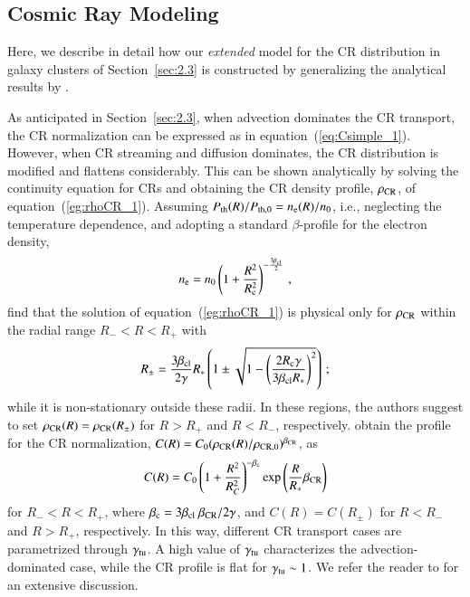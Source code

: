 \documentclass[useAMS,usenatbib]{mn2e}
\begin{document}




\begin{appendix}

\section{Cosmic Ray Modeling}
\label{app:B}

Here, we describe in detail how our \emph{extended} model for the CR distribution
in galaxy clusters of Section~\ref{sec:2.3} is constructed by generalizing the
analytical results by \cite{2011A&A...527A..99E}.

As anticipated in Section~\ref{sec:2.3}, when advection dominates the CR
transport, the CR normalization can be expressed as in
equation~(\ref{eq:Csimple_1}). However, when CR streaming and diffusion
dominates, the CR distribution is modified and flattens considerably. This can
be shown analytically by solving the continuity equation for CRs and obtaining
the CR density profile, $\rho_{{\mathrm{CR}}}$, of
equation~(\ref{eg:rhoCR_1}). Assuming $P_{{\mathrm{th}}}(R)/P_{{\mathrm{th}},0}=n_{{\mathrm{e}}}(R)/n_{0}$, i.e.,
neglecting the temperature dependence, and adopting a standard $\beta$-profile
for the electron density,
%
\begin{equation}
n_{{\mathrm{e}}} = n_{0} \left( 1+\frac{R^{2}}{R_{{\mathrm{c}}}^{2}} \right)^{-\frac{3\beta_{{\mathrm{cl}}}}{2}} \, ,
\label{eq:beta_profile}
\end{equation}
% 
\cite{2011A&A...527A..99E} find that the solution of equation~(\ref{eg:rhoCR_1}) is physical only 
for $\rho_{{\mathrm{CR}}}$ within the radial range $R_{-} < R < R_{+}$ with
%
\begin{equation}
R_{\pm} = \frac{3\beta_{{\mathrm{cl}}}}{2\gamma}R_{*}\left(1\pm\sqrt{1-\left(\frac{2R_{{\mathrm{c}}}\gamma}{3\beta_{{\mathrm{cl}}}R_{*}}\right)^{2}}\right) \, ;
\label{eq:Rpm}
\end{equation} 
%
while it is non-stationary outside these radii. In these regions, the authors
suggest to set $\rho_{{\mathrm{CR}}}(R) = \rho_{\rm{CR}}(R_{\pm})$ for $R > R_{+}$
and $R < R_{-}$, respectively. \cite{2011A&A...527A..99E} obtain the profile for
the CR normalization,
$C(R)=C_{0}(\rho_{{\mathrm{CR}}}(R)/\rho_{{\mathrm{CR}},0})^{\beta_{{\mathrm{CR}}}}$, as
%
\begin{equation}
C(R) = C_{0}\left( 1+ \frac{R^{2}}{R_{C}^{2}} \right)^{-\beta_{{\mathrm{c}}}} {\mathrm{exp}}\left( {\frac{R}{R_{*}}\beta_{{\mathrm{CR}}}} \right)
\label{eq:Ctransport}
\end{equation} 
%
for $R_{-}<R<R_{+}$, where
$\beta_{{\mathrm{c}}}=3\beta_{{\mathrm{cl}}}~\beta_{{\mathrm{CR}}}/2\gamma$, and $C(R) =
C(R_{\pm})$ for $R<R_{-}$ and $R>R_{+}$, respectively. In this way, different CR
transport cases are parametrized through $\gamma_{{\mathrm{tu}}}$.  A high value of
$\gamma_{{\mathrm{tu}}}$ characterizes the advection-dominated case, while the CR
profile is flat for $\gamma_{{\mathrm{tu}}} \sim1$. We refer the reader to
\cite{2011A&A...527A..99E} for an extensive discussion.


\end{appendix}
\end{document}
